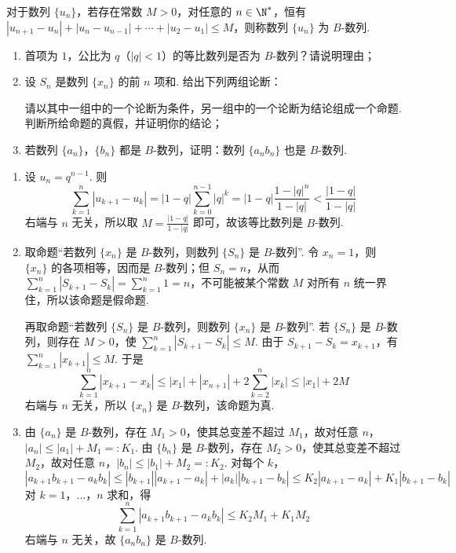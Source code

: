 \begin{problem}
对于数列 \(\{u_n\}\)，若存在常数 \(M > 0\)，对任意的 \(n \in \N^*\)，恒有 \(|u_{n+1} - u_n| + |u_n - u_{n-1}| + \cdots + |u_2 - u_1| \leqslant M\)，则称数列 \(\{u_n\}\) 为 \(B\)-数列.
\begin{enumerate}
\item 首项为 \(1\)，公比为 \(q\)（\(|q| < 1\)）的等比数列是否为 \(B\)-数列？请说明理由；
\item 设 \(S_{n}\) 是数列 \(\{x_{n}\}\) 的前 \(n\) 项和. 给出下列两组论断：
请以其中一组中的一个论断为条件，另一组中的一个论断为结论组成一个命题. 判断所给命题的真假，并证明你的结论；
\item 若数列 \(\{a_{n}\}\)，\(\{b_{n}\}\) 都是 \(B\)-数列，证明：数列 \(\{a_{n}b_{n}\}\) 也是 \(B\)-数列.
\end{enumerate}
\end{problem}

\begin{solution}
\begin{enumerate}
\item 设 \(u_n=q^{n-1}\). 则
\[
\sum_{k=1}^{n}|u_{k+1}-u_k|=|1-q|\sum_{k=0}^{n-1}|q|^k=|1-q|\frac{1-|q|^n}{1-|q|}<\frac{|1-q|}{1-|q|}
\]
右端与 \(n\) 无关，所以取 \(M=\frac{|1-q|}{1-|q|}\) 即可，故该等比数列是 \(B\)-数列.
\item 取命题“若数列 \(\{x_n\}\) 是 \(B\)-数列，则数列 \(\{S_n\}\) 是 \(B\)-数列”. 令 \(x_n=1\)，则 \(\{x_n\}\) 的各项相等，因而是 \(B\)-数列；但 \(S_n=n\)，从而 \(\sum_{k=1}^{n}|S_{k+1}-S_k|=\sum_{k=1}^{n}1=n\)，不可能被某个常数 \(M\) 对所有 \(n\) 统一界住，所以该命题是假命题.

再取命题“若数列 \(\{S_n\}\) 是 \(B\)-数列，则数列 \(\{x_n\}\) 是 \(B\)-数列”. 若 \(\{S_n\}\) 是 \(B\)-数列，则存在 \(M>0\)，使 \(\sum_{k=1}^{n}|S_{k+1}-S_k|\leqslant M\). 由于 \(S_{k+1}-S_k=x_{k+1}\)，有 \(\sum_{k=1}^{n}|x_{k+1}|\leqslant M\). 于是
\[
\sum_{k=1}^{n}|x_{k+1}-x_k|\leqslant |x_1|+|x_{n+1}|+2\sum_{k=2}^{n}|x_k|\leqslant |x_1|+2M
\]
右端与 \(n\) 无关，所以 \(\{x_n\}\) 是 \(B\)-数列，该命题为真.
\item 由 \(\{a_n\}\) 是 \(B\)-数列，存在 \(M_1>0\)，使其总变差不超过 \(M_1\)，故对任意 \(n\)，\(|a_n|\leqslant |a_1|+M_1=:K_1\). 由 \(\{b_n\}\) 是 \(B\)-数列，存在 \(M_2>0\)，使其总变差不超过 \(M_2\)，故对任意 \(n\)，\(|b_n|\leqslant |b_1|+M_2=:K_2\). 对每个 \(k\)，
\[
|a_{k+1}b_{k+1}-a_kb_k|\leqslant |b_{k+1}||a_{k+1}-a_k|+|a_k||b_{k+1}-b_k|\leqslant K_2|a_{k+1}-a_k|+K_1|b_{k+1}-b_k|
\]
对 \(k=1\)，\(\ldots\)，\(n\) 求和，得
\[
\sum_{k=1}^{n}|a_{k+1}b_{k+1}-a_kb_k|\leqslant K_2M_1+K_1M_2
\]
右端与 \(n\) 无关，故 \(\{a_nb_n\}\) 是 \(B\)-数列.
\end{enumerate}
\end{solution}
